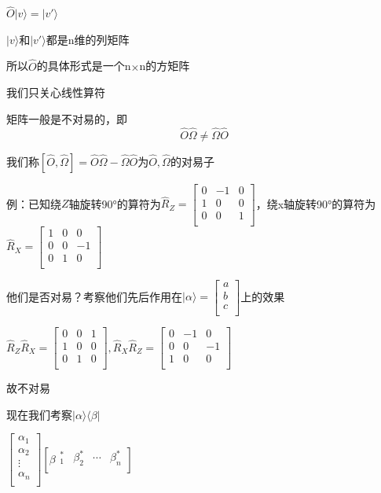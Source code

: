 \documentclass[lang=cn,15pt]{elegantbook}
\begin{document}
$\hat{O}|v\rangle =|v'\rangle$ 

$|v\rangle$和$|v'\rangle$都是n维的列矩阵

所以$\hat{O}$的具体形式是一个n$\times$n的方矩阵

我们只关心线性算符

矩阵一般是不对易的，即
\begin{equation*}
	\hat{O}\hat{\Omega}\ne \hat{\Omega}\hat{O}
\end{equation*}

我们称$\left[ \hat{O},\hat{\Omega} \right] =\hat{O}\hat{\Omega}-\hat{\Omega}\hat{O}
$为$\hat{O},\hat{\Omega}$的对易子

例：已知绕$Z$轴旋转90°的算符为$\hat{R}_Z=\left[ \begin{matrix}
	0&		-1&		0\\
	1&		0&		0\\
	0&		0&		1\\
\end{matrix} \right] $，绕x轴旋转90°的算符为$\hat{R}_X=\left[ \begin{matrix}
1&		0&		0\\
0&		0&		-1\\
0&		1&		0\\
\end{matrix} \right] $

他们是否对易？考察他们先后作用在$|\alpha\rangle=\left[ \begin{array}{c}
	a\\
	b\\
	c\\
\end{array} \right] $上的效果

$\hat{R}_Z\hat{R}_X=\left[ \begin{matrix}
	0&		0&		1\\
	1&		0&		0\\
	0&		1&		0\\
\end{matrix} \right] ,\hat{R}_X\hat{R}_Z=\left[ \begin{matrix}
	0&		-1&		0\\
	0&		0&		-1\\
	1&		0&		0\\
\end{matrix} \right] $

故不对易

现在我们考察$|\alpha \rangle \langle \beta |$

$\left[ \begin{array}{c}
	\alpha _1\\
	\alpha _2\\
	\vdots\\
	\alpha _n\\
\end{array} \right] \left[ \beta \begin{matrix}
	_{1}^{*}&		\beta _{2}^{*}&		\cdots&		\beta _{n}^{*}\\
\end{matrix} \right] $
\end{document}
